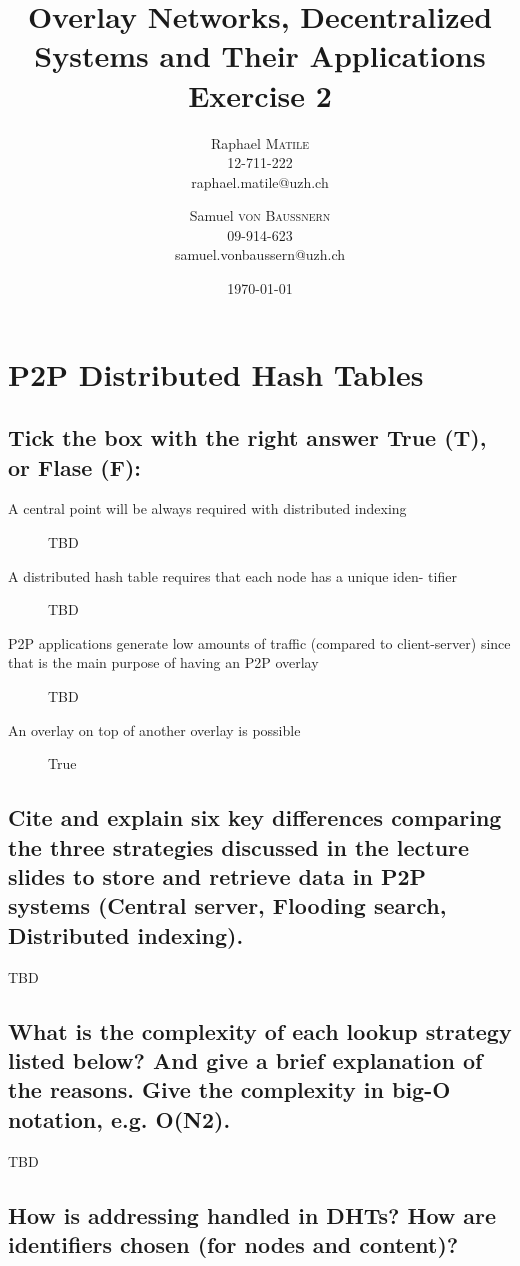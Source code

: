 \documentclass{article}
\title{Overlay Networks, Decentralized Systems and Their Applications
\\Exercise 2}
\author{Raphael \textsc{Matile}\\12-711-222\\raphael.matile@uzh.ch
\and Samuel \textsc{von Baussnern}\\09-914-623\\samuel.vonbaussern@uzh.ch}
\date{\today} %
\begin{document}
\maketitle %

\section{P2P Distributed Hash Tables}

\subsection{Tick the box with the right answer True (T), or Flase (F):}

\begin{description}
  \item[A central point will be always required with distributed indexing]
    TBD
  \item[A distributed hash table requires that each node has a unique iden- tifier]
    TBD
  \item[P2P applications generate low amounts of traffic (compared to client-server) 
        since that is the main purpose of having an P2P overlay]
    TBD
  \item[An overlay on top of another overlay is possible]
    True
\end{description}

\subsection{Cite and explain six key differences comparing the three strategies 
discussed in the lecture slides to store and retrieve data in P2P systems 
(Central server, Flooding search, Distributed indexing).}

TBD

\subsection{What is the complexity of each lookup strategy listed below? 
And give a brief explanation of the reasons. Give the 
complexity in big-O notation, e.g. O(N2).}

TBD

\subsection{How is addressing handled in DHTs? How are identifiers 
chosen (for nodes and content)?}
\end{document}
